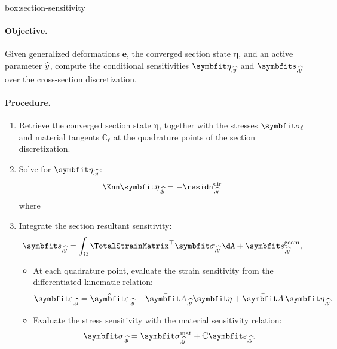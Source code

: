 \begin{ambox}{box:section-sensitivity}
\paragraph{Objective.}
Given generalized deformations \(\bm{e}\), the converged section state \(\bm{\eta}\), and an active parameter \(\widehat{y}\), compute the conditional sensitivities \(\bm{\eta}_{,\HostParameter}\) and \(\bm{s}_{,\HostParameter}\) over the cross-section discretization.

\paragraph{Procedure.}
\begin{enumerate}
    \item Retrieve the converged section state \(\bm{\eta}\), together with the stresses \(\StressVector_\ell\) and material tangents \(\mathbb{C}_\ell\) at the quadrature points of the section discretization.

    \item Solve for \(\bm{\eta}_{,\HostParameter}\):
    \[
    \Knn \bm{\eta}_{,\HostParameter} = -\residn_{,\HostParameter}^{\mathrm{dir}}
    \]
    where
    \item Integrate the section resultant sensitivity:
    \[
    \bm{s}_{,\HostParameter}
    =
    \int_{\Section}
    \TotalStrainMatrix^{\top}\StressVector_{,\HostParameter}\,\dA
    +
    \bm{s}_{,\HostParameter}^{\mathrm{geom}},
    \]
    \begin{itemize}

    \item At each quadrature point, evaluate the strain sensitivity from the differentiated kinematic relation:
    \[
    \StrainVector_{,\HostParameter}
    =
    \hat{\StrainVector}_{,\HostParameter}
    +
    {\EnhanShapes}_{,\HostParameter}\bm{\eta}
    +
    \EnhanShapes\,\bm{\eta}_{,\HostParameter}.
    \]

    \item Evaluate the stress sensitivity with the material sensitivity relation:
    \[
    \StressVector_{,\HostParameter}
    =
    \StressVector_{,\HostParameter}^{\mathrm{mat}}
    +
    \mathbb{C}\StrainVector_{,\HostParameter}.
    \]
    \end{itemize}

\end{enumerate}
\end{ambox}



\endgroup
